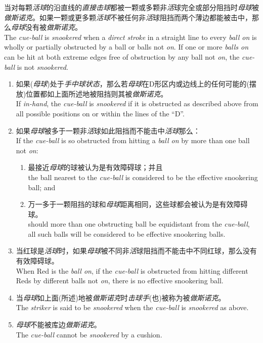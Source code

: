 \noindent 当对每颗\emph{活球}的沿直线的\emph{直接击球}都被一颗或多颗非\emph{活}球完全或部分阻挡时\emph{母球}被\emph{做斯诺克}。如果一颗或更多颗\emph{活球}不被任何非\emph{活}球阻挡而两个薄边都能被击中，那么\emph{母球}没有被\emph{做斯诺克}。\\
The \emph{cue-ball} is \emph{snookered} when a \emph{direct stroke} in a straight line to every \emph{ball on} is wholly or partially obstructed by a ball or balls not \emph{on}. If one or more \emph{balls on} can be hit at both extreme edges free of obstruction by any ball not \emph{on}, the \emph{cue-ball} is not \emph{snookered}.
\begin{enumerate}[label=(\alph*)]
    \item 如果(\emph{母球})处于\emph{手中球状态}，那么若\emph{母球}在D形区内或边线上的任何可能的(摆放)位置都如上面所述地被阻挡则其被\emph{做斯诺克}。\\
    If \emph{in-hand}, the \emph{cue-ball} is \emph{snookered} if it is obstructed as described above from all possible positions on or within the lines of the ``D''.
    \item 如果\emph{母球}被多于一颗非\emph{活}球如此阻挡而不能击中\emph{活球}那么：\\
    If the \emph{cue-ball} is so obstructed from hitting a \emph{ball on} by more than one ball not \emph{on}:
    \begin{enumerate}[label=(\roman*)]
        \item 最接近\emph{母球}的球被认为是有效障碍球；并且\\
        the ball nearest to the \emph{cue-ball} is considered to be the effective snookering ball; and
        \item 万一多于一颗阻挡的球和\emph{母球}距离相同，这些球都会被认为是有效障碍球。\\
        should more than one obstructing ball be equidistant from the \emph{cue-ball}, all such balls will be considered to be effective snookering balls.
    \end{enumerate}
    \item 当红球是\emph{活球}时，如果\emph{母球}被不同非\emph{活}球阻挡而不能击中不同红球，那么没有有效障碍球。\\
    When Red is the \emph{ball on}, if the \emph{cue-ball} is obstructed from hitting different Reds by different balls not \emph{on}, there is no effective snookering ball.
    \item 当\emph{母球}如上面(所述)地被\emph{做斯诺克}时\emph{击球手}(也)被称为被\emph{做斯诺克}。\\
    The \emph{striker} is said to be \emph{snookered} when the \emph{cue-ball} is \emph{snookered} as above.
    \item \emph{母球}不能被库边\emph{做斯诺克}。\\
    The \emph{cue-ball} cannot be \emph{snookered} by a cushion.
\end{enumerate}

